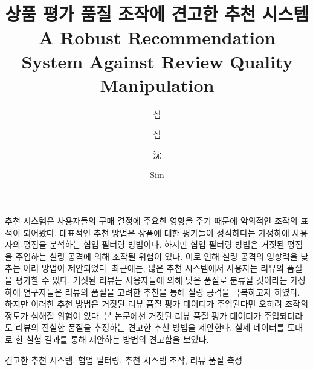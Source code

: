 \documentclass[master,english,final]{kaist-ucs}
\title[korean] {상품 평가 품질 조작에 견고한 추천 시스템}
\title[english]{A Robust Recommendation System \linebreak Against Review Quality Manipulation}
\author[korean] {심}{동 진}
\author[korean2] {심}{동진}    %
\author[chinese]{沈}{東 鎭}
\author[english]{Sim}{Dongjin}
\begin{document}

   \thesisinfo
    \begin{summary}
    추천 시스템은 사용자들의 구매 결정에 주요한 영향을 주기 때문에 악의적인 조작의 표적이 되어왔다.
    대표적인 추천 방법은 상품에 대한 평가들이 정직하다는 가정하에 사용자의 평점을 분석하는 협업 필터링 방법이다.
    하지만 협업 필터링 방법은 거짓된 평점을 주입하는 실링 공격에 의해 조작될 위험이 있다.
    이로 인해 실링 공격의 영향력을 낮추는 여러 방법이 제안되었다.
    최근에는, 많은 추천 시스템에서 사용자는 리뷰의 품질을 평가할 수 있다.
    거짓된 리뷰는 사용자들에 의해 낮은 품질로 분류될 것이라는 가정하에 연구자들은 리뷰의 품질을 고려한 추천을 통해 실링 공격을 극복하고자 하였다.
    하지만 이러한 추천 방법은 거짓된 리뷰 품질 평가 데이터가 주입된다면 오히려 조작의 정도가 심해질 위험이 있다.
    본 논문에선 거짓된 리뷰 품질 평가 데이터가 주입되더라도 리뷰의 진실한 품질을 추정하는 견고한 추천 방법을 제안한다.
    실제 데이터를 토대로 한 실험 결과를 통해 제안하는 방법의 견고함을 보였다.
    \end{summary}

    \begin{Korkeyword}
    견고한 추천 시스템, 협업 필터링, 추천 시스템 조작, 리뷰 품질 측정
    \end{Korkeyword}
\end{document}
